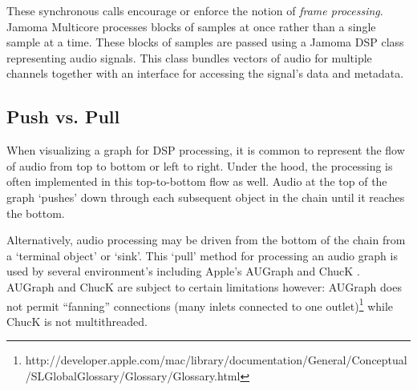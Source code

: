 \documentclass[twoside,a4paper]{article}
\begin{document}

These synchronous calls encourage or enforce the notion of \emph{frame processing}.  
Jamoma Multicore processes blocks of samples at once rather than a single sample at a time.  
These blocks of samples are passed using a Jamoma DSP class representing audio signals.  This class bundles vectors of audio for multiple channels together with an interface for accessing the signal's data and metadata.




\subsection{Push vs. Pull} \label{sec:pull} %

When visualizing a graph for DSP processing, it is common to represent the flow of audio from top to bottom or left to right.  
Under the hood, the processing is often implemented in this top-to-bottom flow as well.  
Audio at the top of the graph `pushes' down through each subsequent object in the chain until it reaches the bottom.

Alternatively, audio processing may be driven from the bottom of the chain from a `terminal object' or `sink'.  
This `pull' method for processing an audio graph is used by several environment's including Apple's AUGraph and ChucK \cite{wang:2008}. 
AUGraph and ChucK are subject to certain limitations however: AUGraph does not permit ``fanning'' connections (many inlets connected to one outlet)\footnote{http://developer.apple.com/mac/library/documentation/General/Conceptual/SLGlobalGlossary/Glossary/Glossary.html} while ChucK is not multithreaded.

\end{document}
